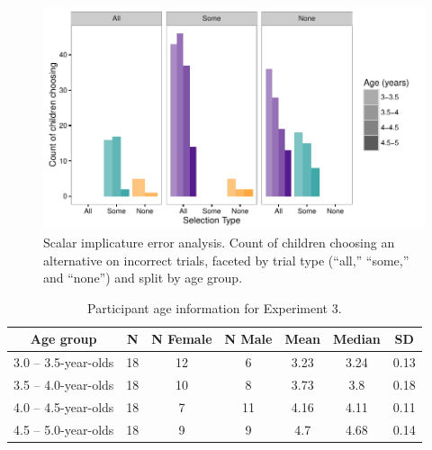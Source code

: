 \documentclass[man]{apa2}
\begin{document}
{\begin{figure}
 \begin{center}
  \includegraphics[width=6in]{figures/exp2_wrong.pdf}
  \caption{\label{fig:exp2_wrong} Scalar implicature error analysis. Count of children choosing an alternative on incorrect trials, faceted by trial type (``all,'' ``some,'' and ``none'') and split by age group.}
 \end{center}
\end{figure}

\begin{table}[tb]
\centering
\begin{tabular}{ccccccc}
\hline
{\bf Age group} & {\bf N} & {\bf N Female} & {\bf N Male} & {\bf Mean} &  {\bf Median} & {\bf SD} \\
\hline
3.0 -- 3.5-year-olds & 18 & 12 & 6 & 3.23 & 3.24 & 0.13\\
3.5 -- 4.0-year-olds & 18 & 10 & 8 & 3.73 & 3.8 & 0.18\\
4.0 -- 4.5-year-olds & 18 & 7 & 11 & 4.16 & 4.11 & 0.11\\
4.5 -- 5.0-year-olds & 18 & 9 & 9 & 4.7 & 4.68 & 0.14\\
\hline
\end{tabular}
\caption{\label{tab:exp_3_demo}Participant age information for Experiment 3.}
\end{table}

}
\end{document}
